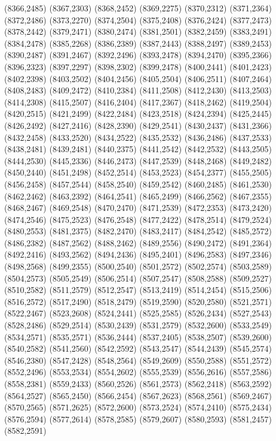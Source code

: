 (8366,2485)
(8367,2303)
(8368,2452)
(8369,2275)
(8370,2312)
(8371,2364)
(8372,2486)
(8373,2270)
(8374,2504)
(8375,2408)
(8376,2424)
(8377,2473)
(8378,2442)
(8379,2471)
(8380,2474)
(8381,2501)
(8382,2459)
(8383,2491)
(8384,2478)
(8385,2268)
(8386,2389)
(8387,2443)
(8388,2497)
(8389,2453)
(8390,2487)
(8391,2467)
(8392,2496)
(8393,2478)
(8394,2470)
(8395,2366)
(8396,2323)
(8397,2297)
(8398,2302)
(8399,2478)
(8400,2441)
(8401,2423)
(8402,2398)
(8403,2502)
(8404,2456)
(8405,2504)
(8406,2511)
(8407,2464)
(8408,2483)
(8409,2472)
(8410,2384)
(8411,2508)
(8412,2430)
(8413,2503)
(8414,2308)
(8415,2507)
(8416,2404)
(8417,2367)
(8418,2462)
(8419,2504)
(8420,2515)
(8421,2499)
(8422,2484)
(8423,2518)
(8424,2394)
(8425,2445)
(8426,2492)
(8427,2416)
(8428,2390)
(8429,2541)
(8430,2437)
(8431,2366)
(8432,2458)
(8433,2520)
(8434,2522)
(8435,2532)
(8436,2486)
(8437,2533)
(8438,2481)
(8439,2481)
(8440,2375)
(8441,2542)
(8442,2532)
(8443,2505)
(8444,2530)
(8445,2336)
(8446,2473)
(8447,2539)
(8448,2468)
(8449,2482)
(8450,2440)
(8451,2498)
(8452,2514)
(8453,2523)
(8454,2377)
(8455,2505)
(8456,2458)
(8457,2544)
(8458,2540)
(8459,2542)
(8460,2485)
(8461,2530)
(8462,2462)
(8463,2392)
(8464,2541)
(8465,2499)
(8466,2562)
(8467,2355)
(8468,2467)
(8469,2548)
(8470,2470)
(8471,2539)
(8472,2353)
(8473,2420)
(8474,2546)
(8475,2523)
(8476,2548)
(8477,2422)
(8478,2514)
(8479,2524)
(8480,2553)
(8481,2375)
(8482,2470)
(8483,2417)
(8484,2542)
(8485,2572)
(8486,2382)
(8487,2562)
(8488,2462)
(8489,2556)
(8490,2472)
(8491,2364)
(8492,2416)
(8493,2562)
(8494,2436)
(8495,2401)
(8496,2583)
(8497,2346)
(8498,2568)
(8499,2355)
(8500,2540)
(8501,2572)
(8502,2574)
(8503,2589)
(8504,2573)
(8505,2549)
(8506,2514)
(8507,2547)
(8508,2588)
(8509,2527)
(8510,2582)
(8511,2579)
(8512,2547)
(8513,2419)
(8514,2454)
(8515,2506)
(8516,2572)
(8517,2490)
(8518,2479)
(8519,2590)
(8520,2580)
(8521,2571)
(8522,2467)
(8523,2608)
(8524,2441)
(8525,2585)
(8526,2434)
(8527,2543)
(8528,2486)
(8529,2514)
(8530,2439)
(8531,2579)
(8532,2600)
(8533,2549)
(8534,2571)
(8535,2571)
(8536,2444)
(8537,2405)
(8538,2507)
(8539,2600)
(8540,2582)
(8541,2560)
(8542,2592)
(8543,2547)
(8544,2439)
(8545,2574)
(8546,2380)
(8547,2428)
(8548,2564)
(8549,2609)
(8550,2588)
(8551,2572)
(8552,2496)
(8553,2534)
(8554,2602)
(8555,2539)
(8556,2616)
(8557,2586)
(8558,2381)
(8559,2433)
(8560,2526)
(8561,2573)
(8562,2418)
(8563,2592)
(8564,2527)
(8565,2450)
(8566,2454)
(8567,2623)
(8568,2561)
(8569,2467)
(8570,2565)
(8571,2625)
(8572,2600)
(8573,2524)
(8574,2410)
(8575,2434)
(8576,2594)
(8577,2614)
(8578,2585)
(8579,2607)
(8580,2593)
(8581,2457)
(8582,2591)
